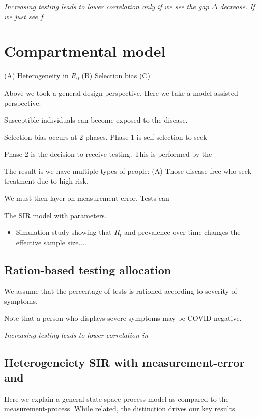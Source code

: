 \documentclass[12pt]{article}
\numberwithin{equation}{section}
\theoremstyle{plain}
\begin{document}
\emph{Increasing testing leads to lower correlation only if we see the gap $\Delta$ decrease.  If we just see $f$ }


\section{Compartmental model}

(A) Heterogeneity in $R_0$
(B) Selection bias
(C)

Above we took a general design perspective.  Here we take a model-assisted perspective.

Susceptible individuals can become exposed to the disease.

Selection bias occurs at 2 phases. Phase 1 is self-selection to seek

Phase 2 is the decision to receive testing.  This is performed by the

The result is we have multiple types of people: (A) Those disease-free who seek treatment due to high risk.

We must then layer on measurement-error.  Tests can

The SIR model with parameters.

\begin{itemize}
\item Simulation study showing that $R_t$ and prevalence over time changes the effective sample size....
\end{itemize}

\subsection{Ration-based testing allocation}

We assume that the percentage of tests is rationed according to severity of symptoms.

Note that a person who displays severe symptoms may be COVID negative.



\emph{Increasing testing leads to lower correlation in}


\subsection{Heterogeneiety  SIR with measurement-error and }

Here we explain a general state-space process model as compared to the measurement-process.  While related, the distinction drives our key results.
\end{document}
